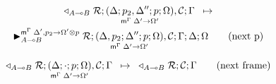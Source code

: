 \begin{multline}
\transx{\contstate{A \lolli B}{\rulestk}{\lframe{\Delta}{p_2,
   \Delta''}{p}{\Omega}{\Delta'}{\Omega'}, \lstack{C}}{\Gamma}}
{
   \matstate{A \lolli B}{\rulestk}{\lframe{\Delta,
      p_2}{\Delta''}{p}{\Omega}{\Delta'}{\Omega'},
   \lstack{C}}{\Gamma}{\Delta}{\Omega}{\Delta', p_2 \rightarrow \Omega' \otimes p}}
   \tag{next p}
\end{multline}

\vspace{-5mm}

\begin{align}
\trans{\contstate{A \lolli
   B}{\rulestk}{\lframe{\Delta}{\cdot}{p}{\Omega}{\Delta'}{\Omega'},
      \lstack{C}}{\Gamma}}
{
   \contstate{A \lolli B}{\rulestk}{\lstack{C}}{\Gamma}} \tag{next frame}
\end{align}
